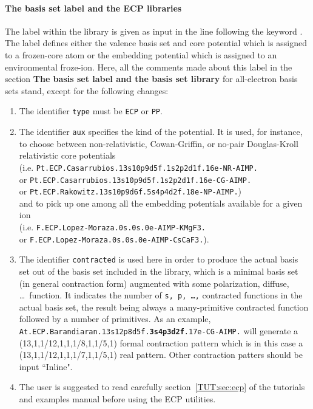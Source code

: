 \paragraph{The basis set label and the ECP libraries}

The label within the  library
is given as input in the line following the keyword .
The label defines either the valence basis set and core potential
which is assigned to a
frozen-core atom
or the embedding potential
which is assigned to an environmental froze-ion.
Here, all the comments made about this label in the section
{\bf The basis set label and the basis set library}
for all-electron basis sets
stand, except for the following changes:
\begin{enumerate}
\item The identifier {\tt type} must be {\tt ECP} or {\tt PP}.
\item The identifier {\tt aux} specifies the kind of the potential.
It is used, for instance, to choose between non-relativistic, Cowan-Griffin, or no-pair
Douglas-Kroll relativistic core potentials
\\
(i.e. {\tt Pt.ECP.\-Casarrubios.\-13s10p9d5f.\-1s2p2d1f.\-16e-NR-AIMP.}
\\
or {\tt Pt.ECP.\-Casarrubios.\-13s10p9d5f.\-1s2p2d1f.\-16e-CG-AIMP.}
\\
or {\tt Pt.ECP.\-Rakowitz.\-13s10p9d6f.\-5s4p4d2f.\-18e-NP-AIMP.})
\\
and to pick up one among all the embedding potentials available
for a given ion
\\
(i.e. {\tt F.ECP.\-Lopez-Moraza.\-0s.0s.\-0e-AIMP-KMgF3.}
\\
or {\tt F.ECP.\-Lopez-Moraza.\-0s.0s.\-0e-AIMP-CsCaF3.}).
 
\item The identifier {\tt contracted} is used here 
in order to produce the actual basis set
out of the basis set included in the \mbox{} library,
which is a minimal basis set (in general contraction form) augmented
with some polarization, diffuse, \ldots\ function.
It indicates the number of {\tt s, p, \ldots,} contracted functions 
in the actual basis set,
the result being always a many-primitive contracted function
followed by a number of primitives.
As an example, 
{\tt At.ECP.Barandiaran.13s12p8d5f.{\bf 3s4p3d2f}.17e-CG-AIMP.}
will generate a (13,1,1/12,1,1,1/8,1,1/5,1) formal contraction pattern
which is in this case a (13,1,1/12,1,1,1/7,1,1/5,1) real pattern.
Other contraction patters should be input ``Inline".

\item The user is suggested to read carefully section~\ref{TUT:sec:ecp}
of the tutorials and examples manual before using the ECP utilities.

\end{enumerate}


